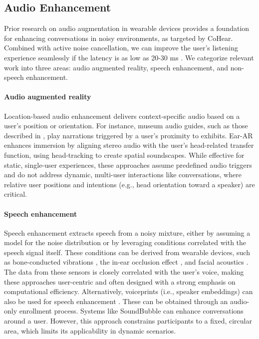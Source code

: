\subsection{Audio Enhancement}
Prior research on audio augmentation in wearable devices provides a foundation for enhancing conversations in noisy environments, as targeted by CoHear. Combined with active noise cancellation, we can improve the user's listening experience seamlessly if the latency is as low as 20-30 ms \cite{stone1999tolerable, gupta2020acoustic}. 
We categorize relevant work into three areas: audio augmented reality, speech enhancement, and non-speech enhancement.

\paragraph{Audio augmented reality}
Location-based audio enhancement delivers context-specific audio based on a user’s position or orientation. For instance, museum audio guides, such as those described in \cite{harma2004augmented}, play narrations triggered by a user’s proximity to exhibits. Ear-AR \cite{yang2020ear} enhances immersion by aligning stereo audio with the user’s head-related transfer function, using head-tracking to create spatial soundscapes. 
While effective for static, single-user experiences, these approaches assume predefined audio triggers and do not address dynamic, multi-user interactions like conversations, where relative user positions and intentions (e.g., head orientation toward a speaker) are critical.

\paragraph{Speech enhancement}
Speech enhancement extracts speech from a noisy mixture, either by assuming a model for the noise distribution \cite{wiener1949extrapolation} or by leveraging conditions correlated with the speech signal itself.
These conditions can be derived from wearable devices, such as bone-conducted vibrations \cite{he2023towards}, the in-ear occlusion effect \cite{han2024earspeech}, and facial acoustics \cite{zhang2025wearse}. The data from these sensors is closely correlated with the user's voice, making these approaches user-centric and often designed with a strong emphasis on computational efficiency.
Alternatively, voiceprints (i.e., speaker embeddings) can also be used for speech enhancement \cite{zmolikova2023neural, veluri2024look}. These can be obtained through an audio-only enrollment process.
Systems like SoundBubble \cite{chen2024hearable} can enhance conversations around a user. However, this approach constrains participants to a fixed, circular area, which limits its applicability in dynamic scenarios.

